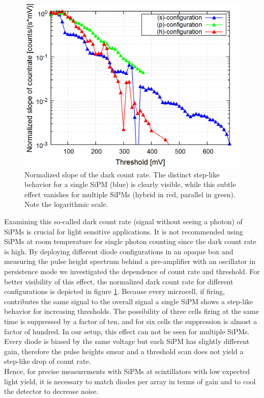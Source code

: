 \documentclass[%
 reprint,
 amsmath,amssymb,
 aps,
]{revtex4-1}
\begin{document}
\begin{figure}[b!]
	\centering
	\includegraphics[width=0.9\linewidth]{./plots/dark_electron_spectrum/slope_countrate.png}
	\caption{Normalized slope of the dark count rate. The distinct step-like behavior for a single SiPM (blue) is clearly visible, while this subtle effect vanishes for multiple SiPMs (hybrid in red, parallel in green). Note the logarithmic scale. }
	\label{fig:dark_count_rate}
\end{figure} 
Examining this so-called dark count rate (signal without seeing a photon) of SiPMs is crucial for light sensitive applications. It is not recommended using SiPMs at room temperature for single photon counting since the dark count rate is high. By deploying different diode configurations in an opaque box and measuring the pulse height spectrum behind a pre-amplifier with an oscillator in persistence mode we investigated the dependence of count rate and threshold. For better visibility of this effect, the normalized dark count rate for different configurations is depicted in figure \ref{fig:dark_count_rate}. Because every microcell, if firing, contributes the same signal to the overall signal a single SiPM shows a step-like behavior for increasing thresholds. The possibility of three cells firing at the same time is suppressed by a factor of ten, and for six cells the suppression is almost a factor of hundred. In our setup, this effect can not be seen for multiple SiPMs. Every diode is biased by the same voltage but each SiPM has slightly different gain, therefore the pulse heights smear and a threshold scan does not yield a step-like drop of count rate. \\ \indent
Hence, for precise measurements with SiPMs at scintillators with low expected light yield, it is necessary to match diodes per array in terms of gain and to cool the detector to decrease noise. \\ \indent
\end{document}
